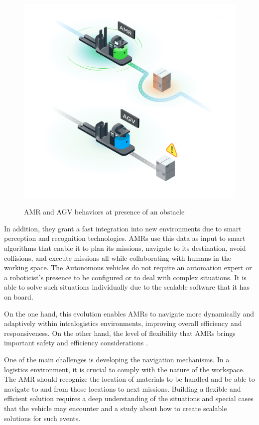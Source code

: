 \begin{figure}[H]
    \begin{center}
       \includegraphics[width=5in]{images/Chap1/AMR-VS-AGV.png}\\
       \caption{AMR and AGV behaviors at presence of an obstacle \cite{R9}}
       \label{AMR-VS-AGV}
       \end{center}
\end{figure}

In addition, they grant a fast integration into new environments due to smart perception 
and recognition technologies. AMRs use this data as input to smart algorithms that 
enable it to plan its missions, navigate to its destination, avoid collisions, and 
execute missions all while collaborating with humans in the working space. The 
Autonomous vehicles do not require an automation expert or a roboticist’s presence to 
be configured or to deal with complex situations. It is able to solve such situations 
individually due to the scalable software that it has on board.

On the one hand, this evolution enables AMRs to navigate more dynamically and adaptively 
within intralogistics environments, improving overall efficiency and responsiveness. 
On the other hand, the level of flexibility that AMRs brings important safety and 
efficiency considerations \cite{R7}.

One of the main challenges is developing the navigation mechanisms. In a logistics 
environment, it is crucial to comply with the nature of the workspace. The AMR should 
recognize the location of materials to be handled and be able to navigate to and from 
those locations to next missions. Building a flexible and efficient solution requires a 
deep understanding of the situations and special cases that the vehicle may encounter 
and a study about how to create scalable solutions for such events.  

